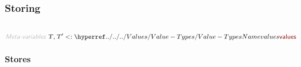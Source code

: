 \subsubsection*{Storing}\hypertarget{storing}{}\label{storing}

\begin{align*}
  [ ~ 
  \KEY{Datatype} ~ & \NAMEREF{locations} \\
  \KEY{Alias} ~ & \NAMEREF{locs} \\
  \KEY{Type} ~ & \NAMEREF{stores} \\
  \KEY{Entity} ~ & \NAMEREF{store} \\
  \KEY{Funcon} ~ & \NAMEREF{initialise-storing} \\
  \KEY{Funcon} ~ & \NAMEREF{store-clear} \\
  \KEY{Datatype} ~ & \NAMEREF{variables} \\
  \KEY{Alias} ~ & \NAMEREF{vars} \\
  \KEY{Funcon} ~ & \NAMEREF{variable} \\
  \KEY{Alias} ~ & \NAMEREF{var} \\
  \KEY{Funcon} ~ & \NAMEREF{allocate-variable} \\
  \KEY{Alias} ~ & \NAMEREF{alloc} \\
  \KEY{Funcon} ~ & \NAMEREF{recycle-variables} \\
  \KEY{Alias} ~ & \NAMEREF{recycle} \\
  \KEY{Funcon} ~ & \NAMEREF{initialise-variable} \\
  \KEY{Alias} ~ & \NAMEREF{init} \\
  \KEY{Funcon} ~ & \NAMEREF{allocate-initialised-variable} \\
  \KEY{Alias} ~ & \NAMEREF{alloc-init} \\
  \KEY{Funcon} ~ & \NAMEREF{assign} \\
  \KEY{Funcon} ~ & \NAMEREF{assigned} \\
  \KEY{Funcon} ~ & \NAMEREF{current-value} \\
  \KEY{Funcon} ~ & \NAMEREF{un-assign} \\
  \KEY{Funcon} ~ & \NAMEREF{structural-assign} \\
  \KEY{Funcon} ~ & \NAMEREF{structural-assigned}
  ~ ]
\end{align*}
\begin{align*}
  \KEY{Meta-variables} ~ 
  & \VAR{T}, \VAR{T}' <: \NAMEHYPER{../../../Values}{Value-Types}{values}
\end{align*}
\paragraph*{Stores}\hypertarget{stores}{}\label{stores}

